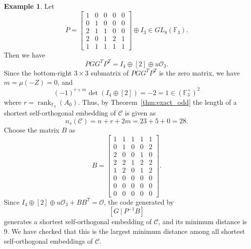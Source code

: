 \documentclass{article}
\theoremstyle{definition}
\newtheorem{example}{Example}[section]
\theoremstyle{remark}
\begin{document}
\begin{example}
    Let
    \[
    P=\begin{bmatrix}
        1 & 0 & 0 & 0 & 0\\
        0 & 1 & 0 & 0 & 0\\
        2 & 1 & 1 & 0 & 0\\
        2 & 0 & 1 & 2 & 1\\
        1 & 1 & 1 & 1 & 1
    \end{bmatrix}\oplus I_3\in GL_8(\mathbb{F}_3).
    \]
    Then we have
    \[
    PGG^TP^T=I_4\oplus[2]\oplus u\mathcal{O}_3.
    \]
    Since the bottom-right $3\times 3$ submatrix of $PGG^TP^T$ is the zero matrix, we have $m=\mu(-Z)=0$, and 
    \[
    (-1)^{r+m}\det(I_4\oplus[2])=-2=1\in (\mathbb{F}_3^\times)^2
    \]
    where $r=\operatorname{rank}_{\mathbb{F}_q}(A_0)$. Thus, by Theorem~\ref{thm:exact_odd} the length of a shortest self-orthogonal embedding of $\mathcal{C}$ is given as
    \[
    n_s(\mathcal{C})=n+r+2m=23+5+0=28.
    \]
    Choose the matrix $B$ as 
    \[
    B = \begin{bmatrix}
        1 & 1 & 1 & 1 & 1\\
        0 & 1 & 0 & 0 & 2\\
        2 & 0 & 0 & 1 & 0\\
        2 & 2 & 1 & 2 & 2\\
        1 & 2 & 0 & 1 & 2\\
        0 & 0 & 0 & 0 & 0\\
        0 & 0 & 0 & 0 & 0\\
        0 & 0 & 0 & 0 & 0
    \end{bmatrix}.
    \]
    Since $I_4\oplus[2]\oplus u\mathcal{O}_3+BB^T=\mathcal{O}$, the code generated by
    \[
    [G~|~P^{-1}B]
    \]
    generates a shortest self-orthogonal embedding of $\mathcal{C}$, and its minimum distance is 9. We have checked that this is the largest minimum distance among all shortest self-orthogonal embeddings of $\mathcal{C}$.  
\end{example}
\end{document}
